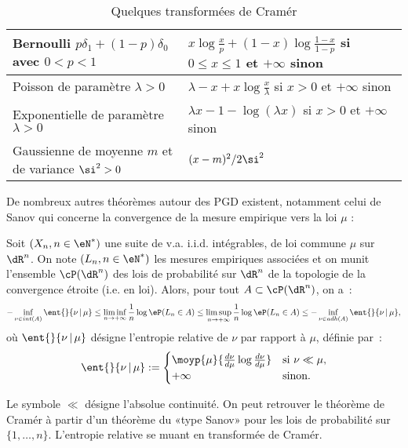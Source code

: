 \begin{table}[htbp]
  \begin{center}\small
    \begin{tabular}[c]{|l|l|}\hline
      Bernoulli $p\delta_1 + (1-p)\delta_0$ avec $0<p<1$&
      $x\log\frac{x}{p} + (1-x)\log\frac{1-x}{1-p}$ si
      $0\leq x\leq 1$ et $+\infty$ sinon \\ \hline
      Poisson de paramètre $\lambda>0$ &
      $\lambda-x+x\log\frac{x}{\lambda}$ si $x>0$ et $+\infty$ sinon \\ \hline
      Exponentielle de paramètre $\lambda>0$ &
      $\lambda x -1 -\log(\lambda x)$ si $x>0$ et $+\infty$ sinon\\ \hline
      Gaussienne de moyenne $m$ et de variance $\si^2>0$ &
      $(x-m)^2/{2\si^2}$ \\ \hline
    \end{tabular}
    \caption{Quelques transformées de Cramér}
    \label{tab:exple-transfo-cramer}
  \end{center}
\end{table}
De nombreux autres théorèmes autour des PGD existent, notamment celui de Sanov
qui concerne la convergence de la mesure empirique vers la loi $\mu$ :
\begin{thm}
  Soit $(X_n,n\in\eN^*)$ une suite de v.a. i.i.d. intégrables, de loi commune
  $\mu$ sur $\dR^n$. On note $(L_n,n\in\eN^*)$ les mesures empiriques associées et
  on munit l'ensemble $\cP(\dR^n)$ des lois de probabilité sur $\dR^n$ de la
  topologie de la convergence étroite (i.e. en loi).  Alors, pour tout
  $A\subset\cP(\dR^n)$, on a~:
$$
-\inf_{\nu\in int(A)} \ent{}{\nu\,\vert\,\mu}
\leq
\liminf_{n\to+\infty} \frac{1}{n}\log\eP(L_n\in A)
\leq 
\limsup_{n\to+\infty} \frac{1}{n}\log\eP(L_n\in A)
\leq
-\inf_{\nu\in adh(A)} \ent{}{\nu\,\vert\,\mu},
$$
où $\ent{}{\nu\,\vert\,\mu}$ désigne l'entropie relative de $\nu$ par rapport
à $\mu$, définie par~:
$$
\ent{}{\nu\,\vert\,\mu}:=
\begin{cases}
\moyp{\mu}{\frac{d\nu}{d\mu}\log \frac{d\nu}{d\mu}} & \text{si } \nu \ll \mu,\\
+\infty & \text{sinon}.
\end{cases}
$$
\end{thm}
Le symbole $\ll$ désigne l'absolue continuité. On peut retrouver le théorème
de Cramér à partir d'un théorème du «type Sanov» pour les lois de probabilité
sur $\{1,\ldots,n\}$. L'entropie relative se muant en transformée de Cramér.

